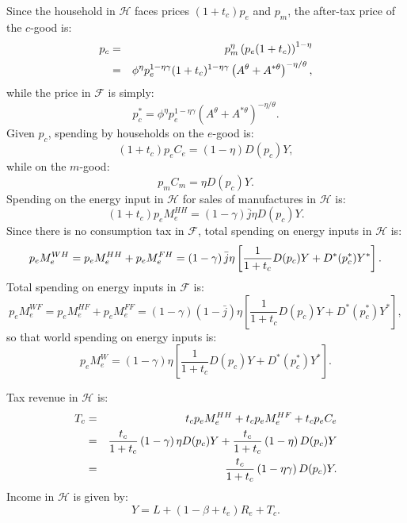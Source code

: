 \documentclass[notitlepage,12pt]{article}
\begin{document}
Since the household in $\mathcal{H}$ faces prices $(1+t_{c})p_{e}$ and $%
p_{m} $, the after-tax price of the $c$-good is:%
\begin{eqnarray}
p_{c} &=&p_{m}^{\eta }\left( p_{e}(1+t_{c})\right) ^{1-\eta }  \notag \\
&=&\phi ^{\eta }p_{e}^{1-\eta \gamma }(1+t_{c})^{1-\eta \gamma }\left(
A^{\theta }+A^{\ast \theta }\right) ^{-\eta /\theta },
\label{p_c home consumption tax1}
\end{eqnarray}%
while the price in $\mathcal{F}$ is simply:%
\begin{equation}
p_{c}^{\ast }=\phi ^{\eta }p_{e}^{1-\eta \gamma }\left( A^{\theta }+A^{\ast
\theta }\right) ^{-\eta /\theta }.  \label{p_c star home consumption tax}
\end{equation}%
Given $p_{c}$, spending by households on the $e$-good is:%
\begin{equation*}
(1+t_{c})p_{e}C_{e}=\left( 1-\eta \right) D(p_{c})Y,
\end{equation*}%
while on the $m$-good:%
\begin{equation*}
p_{m}C_{m}=\eta D(p_{c})Y.
\end{equation*}%
Spending on the energy input in $\mathcal{H}$ for sales of manufactures in $%
\mathcal{H}$ is:%
\begin{equation*}
(1+t_{c})p_{e}M_{e}^{HH}=\left( 1-\gamma \right) \bar{j}\eta D(p_{c})Y.
\end{equation*}%
Since there is no consumption tax in $\mathcal{F}$, total spending on energy
inputs in $\mathcal{H}$ is:%
\begin{equation*}
p_{e}M_{e}^{WH}=p_{e}M_{e}^{HH}+p_{e}M_{e}^{FH}=\left( 1-\gamma \right) \bar{%
j}\eta \left[ \frac{1}{1+t_{c}}D(p_{c})Y+D^{\ast }(p_{c}^{\ast })Y^{\ast }%
\right] .
\end{equation*}%
Total spending on energy inputs in $\mathcal{F}$ is:%
\begin{equation*}
p_{e}M_{e}^{WF}=p_{e}M_{e}^{HF}+p_{e}M_{e}^{FF}=\left( 1-\gamma \right)
\left( 1-\bar{j}\right) \eta \left[ \frac{1}{1+t_{c}}D(p_{c})Y+D^{\ast
}(p_{c}^{\ast })Y^{\ast }\right] ,
\end{equation*}%
so that world spending on energy inputs is:%
\begin{equation*}
p_{e}M_{e}^{W}=\left( 1-\gamma \right) \eta \left[ \frac{1}{1+t_{c}}%
D(p_{c})Y+D^{\ast }(p_{c}^{\ast })Y^{\ast }\right] .
\end{equation*}

Tax revenue in $\mathcal{H}$ is:%
\begin{eqnarray*}
T_{c} &=&t_{c}p_{e}M_{e}^{HH}+t_{c}p_{e}M_{e}^{HF}+t_{c}p_{e}C_{e} \\
&=&\frac{t_{c}}{1+t_{c}}\left( 1-\gamma \right) \eta D(p_{c})Y+\frac{t_{c}}{%
1+t_{c}}\left( 1-\eta \right) D(p_{c})Y \\
&=&\frac{t_{c}}{1+t_{c}}\left( 1-\eta \gamma \right) D(p_{c})Y.
\end{eqnarray*}%
Income in $\mathcal{H}$ is given by:%
\begin{equation}
Y=L+\left( 1-\beta +t_{e}\right) R_{e}+T_{c}.  \label{Y home consumption tax}
\end{equation}
\end{document}
